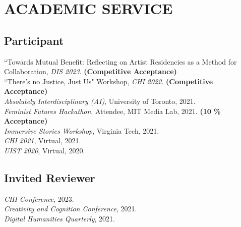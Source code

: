  \section{ACADEMIC SERVICE}

 \subsection{Participant}
 ``Towards Mutual Benefit: Reflecting on Artist Residencies as a Method for Collaboration, \emph{DIS 2023}. \textbf{(Competitive Acceptance)}\\
``There's no Justice, Just Us" Workshop, \emph{CHI 2022}. \textbf{(Competitive Acceptance)}\\
\emph{Absolutely Interdisciplinary (AI)}, University of Toronto, 2021.\\
\emph{Feminist Futures Hackathon}, Attendee, MIT Media Lab, 2021. \textbf{(10 \% Acceptance)}\\
\emph{Immersive Stories Workshop}, Virginia Tech, 2021.\\
\emph{CHI 2021}, Virtual, 2021. \\
\emph{UIST 2020}, Virtual, 2020. 

  \subsection{Invited Reviewer}
   \emph{CHI Conference}, 2023. \\
 \emph{Creativity and Cognition Conference}, 2021. \\
  \emph{Digital Humanities Quarterly}, 2021. \\